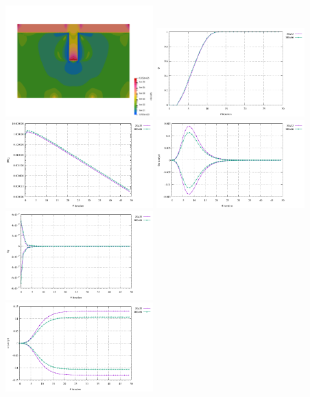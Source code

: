 \begin{center}
\includegraphics[width=5.7cm]{python_codes/fieldstone_87/results/experiment_04/100x66_N/etan.png}
\includegraphics[width=5.7cm]{python_codes/fieldstone_87/results/experiment_04/theta}\\
\includegraphics[width=5.7cm]{python_codes/fieldstone_87/results/experiment_04/conv}
\includegraphics[width=5.7cm]{python_codes/fieldstone_87/results/experiment_04/du}
\includegraphics[width=5.7cm]{python_codes/fieldstone_87/results/experiment_04/dp}\\
\includegraphics[width=5.7cm]{python_codes/fieldstone_87/results/experiment_04/u}

\end{center}
